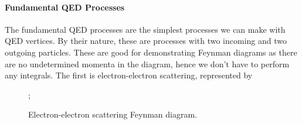 \paragraph{Fundamental QED Processes}
The fundamental QED processes are the simplest processes we can make with QED vertices. By their nature, these are processes with two incoming and two outgoing particles. These are good for demonstrating Feynman diagrams as there are no undetermined momenta in the diagram, hence we don't have to perform any integrals. The first is electron-electron scattering, represented by
\begin{figure}[!ht]
	\centering
	;
	\caption{Electron-electron scattering Feynman diagram.}
	\label{fig:eescat}
\end{figure}

